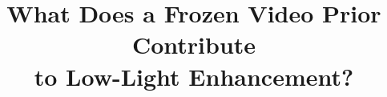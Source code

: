 \documentclass[10pt,twocolumn,letterpaper]{article}
\title{What Does a Frozen Video Prior Contribute\\
       to Low-Light Enhancement?}
\author{}
\begin{document}
\maketitle









{\small


}

\clearpage
\appendix


\end{document}
